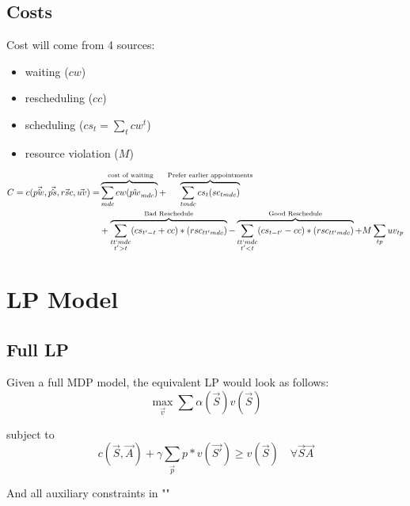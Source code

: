 \documentclass{article}
\begin{document}
\subsection{Costs}
Cost will come from 4 sources:  
\begin{itemize} 
	\item waiting ($cw$)
	\item rescheduling ($cc$) 
	\item scheduling ($cs_{t} = \sum_{t}cw^{t}$)
	\item resource violation ($M$)
\end{itemize}

\begin{equation}\begin{alignedat}{10}
	& C = c(\vec{\hat{pw}}, \vec{\hat{ps}}, \vec{rsc}, \vec{uv}) = 
		&& 
			\overbrace{ \sum_{mdc} cw (\hat{pw}_{mdc}) }^\text{
				cost of waiting}  + 
			\overbrace{
				\sum_{tmdc} cs_{t} (sc_{tmdc})
			}^\text{Prefer earlier appointments} \\ 
	&	&&  +
			\overbrace{
				\sum_{
				\substack{tt`mdc \\ t' > t}} 
				(cs_{t'-t} + cc) * (rsc_{tt'mdc})}^\text{Bad Reschedule} - 
			\overbrace{ 
				\sum_{
				\substack{tt`mdc \\ t' < t}}
				(cs_{t-t'} - cc) * (rsc_{tt'mdc})}^\text{Good Reschedule} + 
			M \sum_{tp} uv_{tp}
\end{alignedat}\end{equation}

\section{LP Model}

\subsection{Full LP} 
Given a full MDP model, the equivalent LP would look as follows:
\begin{equation}
	\max_{\vec{v}} \sum \alpha (\vec{S}) v(\vec{S}) 
\end{equation}

subject to
\begin{equation}
\label{full-adp-equation}
	c(\vec{S}, \vec{A}) + \gamma \sum_{\vec{p}} p * v( \vec{S'}) 
		\ge v(\vec{S}) \quad \forall \vec{S} \vec{A}
\end{equation}

And all auxiliary constraints in ""
\end{document}
